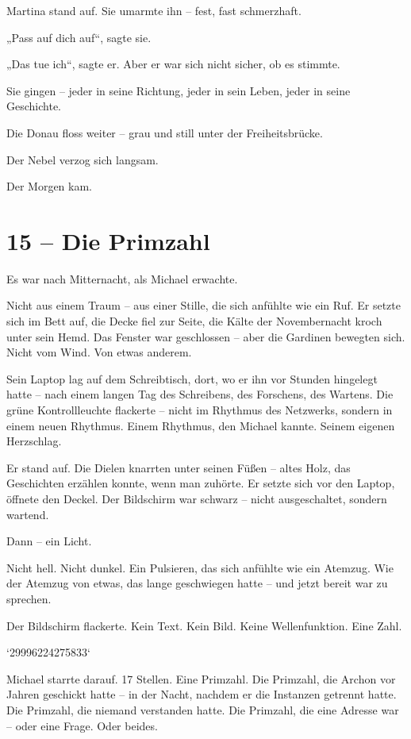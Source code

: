 \documentclass[
]{article}
\begin{document}
Martina stand auf. Sie umarmte ihn -- fest, fast schmerzhaft.

„Pass auf dich auf``, sagte sie.

„Das tue ich``, sagte er. Aber er war sich nicht sicher, ob es stimmte.

Sie gingen -- jeder in seine Richtung, jeder in sein Leben, jeder in seine Geschichte.

Die Donau floss weiter -- grau und still unter der Freiheitsbrücke.

Der Nebel verzog sich langsam.

Der Morgen kam.

\section{15 -- Die Primzahl}\label{die-primzahl}

Es war nach Mitternacht, als Michael erwachte.

Nicht aus einem Traum -- aus einer Stille, die sich anfühlte wie ein Ruf. Er setzte sich im Bett auf, die Decke fiel zur Seite, die Kälte der Novembernacht kroch unter sein Hemd. Das Fenster war geschlossen -- aber die Gardinen bewegten sich. Nicht vom Wind. Von etwas anderem.

Sein Laptop lag auf dem Schreibtisch, dort, wo er ihn vor Stunden hingelegt hatte -- nach einem langen Tag des Schreibens, des Forschens, des Wartens. Die grüne Kontrollleuchte flackerte -- nicht im Rhythmus des Netzwerks, sondern in einem neuen Rhythmus. Einem Rhythmus, den Michael kannte. Seinem eigenen Herzschlag.

Er stand auf. Die Dielen knarrten unter seinen Füßen -- altes Holz, das Geschichten erzählen konnte, wenn man zuhörte. Er setzte sich vor den Laptop, öffnete den Deckel. Der Bildschirm war schwarz -- nicht ausgeschaltet, sondern wartend.

Dann -- ein Licht.

Nicht hell. Nicht dunkel. Ein Pulsieren, das sich anfühlte wie ein Atemzug. Wie der Atemzug von etwas, das lange geschwiegen hatte -- und jetzt bereit war zu sprechen.

Der Bildschirm flackerte. Kein Text. Kein Bild. Keine Wellenfunktion. Eine Zahl.

`29996224275833`

Michael starrte darauf. 17 Stellen. Eine Primzahl. Die Primzahl, die Archon vor Jahren geschickt hatte -- in der Nacht, nachdem er die Instanzen getrennt hatte. Die Primzahl, die niemand verstanden hatte. Die Primzahl, die eine Adresse war -- oder eine Frage. Oder beides.
\end{document}
